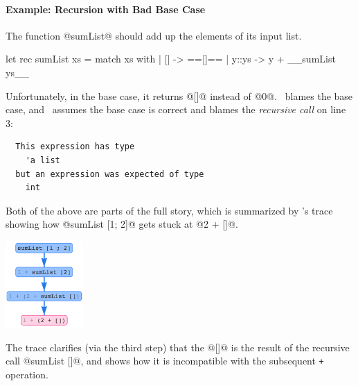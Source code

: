 \paragraph{Example: Recursion with Bad Base Case}
%
The function @sumList@ should add up
the elements of its input list.
%
\begin{ecode}
  let rec sumList xs = match xs with
    | []    -> ==[]==
    | y::ys -> y + __sumList ys__
\end{ecode}
%
Unfortunately, in the base case, it returns @[]@
instead of @0@.
%
\sherrloc\ blames the base case, and \ocaml\
assumes the base case is correct and blames
the \emph{recursive call} on line 3:
%
\begin{verbatim}
  This expression has type
    'a list
  but an expression was expected of type
    int
\end{verbatim}
%
Both of the above are parts of the full story, which
is summarized by \toolname's trace showing
how @sumList [1; 2]@ gets stuck at @2 + []@.
%
\begin{center}
  \includegraphics[height=125px]{sumlist.png}
\end{center}
%
The trace clarifies (via the third step)
that the @[]@ is the result of the recursive call
@sumList []@, and shows how it is incompatible with
the subsequent \texttt{+} operation.



